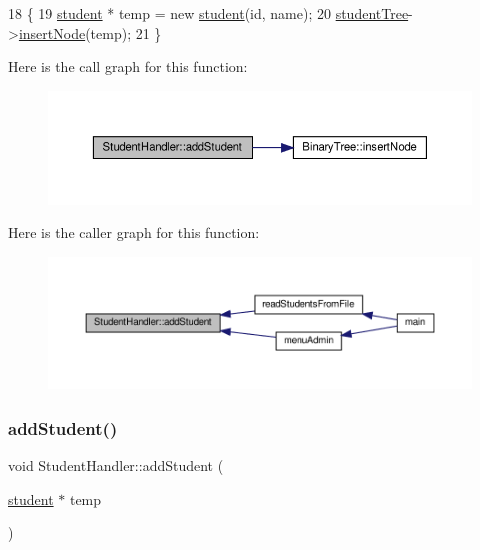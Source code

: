\begin{DoxyCode}
18                                                       \{
19     \hyperlink{classstudent}{student} * temp = \textcolor{keyword}{new} \hyperlink{classstudent}{student}(\textcolor{keywordtype}{id}, name);
20     \hyperlink{class_student_handler_a7141eccd57a30aa140e5b4e92b0939ea}{studentTree}->\hyperlink{class_binary_tree_a69ae782d438253d40cbd194737feca17}{insertNode}(temp);
21 \}
\end{DoxyCode}
Here is the call graph for this function\+:
\nopagebreak
\begin{figure}[H]
\begin{center}
\leavevmode
\includegraphics[width=350pt]{class_student_handler_ae7219f3612d49a8bda1cb14c48557b37_cgraph}
\end{center}
\end{figure}
Here is the caller graph for this function\+:
\nopagebreak
\begin{figure}[H]
\begin{center}
\leavevmode
\includegraphics[width=350pt]{class_student_handler_ae7219f3612d49a8bda1cb14c48557b37_icgraph}
\end{center}
\end{figure}
\mbox{\label{class_student_handler_a1d0e1f3e8383c38d5c9c5781fb8ce82d}} 
\subsubsection{\texorpdfstring{add\+Student()}{addStudent()}\hspace{0.1cm}{\footnotesize\ttfamily [2/2]}}
{\footnotesize\ttfamily void Student\+Handler\+::add\+Student (\begin{DoxyParamCaption}\item[{\hyperlink{classstudent}{student} $\ast$}]{temp }\end{DoxyParamCaption})}

